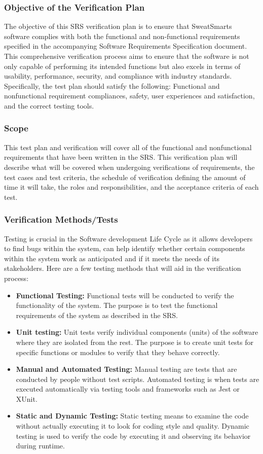 \documentclass[12pt, titlepage]{article}
\begin{document}
\subsubsection{Objective of the Verification Plan}
The objective of this SRS verification plan is to ensure that SweatSmarts software complies with both the functional and non-functional requirements specified in the accompanying Software Requirements Specification document. This comprehensive verification process aims to ensure that the software is not only capable of performing its intended functions but also excels in terms of usability, performance, security, and compliance with industry standards. Specifically, the test plan should satisfy the following: Functional and nonfunctional requirement compliances, safety, user experiences and satisfaction, and the correct testing tools.

\subsubsection{Scope}
This test plan and verification will cover all of the functional and nonfunctional requirements that have been written in the SRS. This verification plan will describe what will be covered when undergoing verifications of requirements, the test cases and test criteria, the schedule of verification defining the amount of time it will take, the roles and responsibilities, and the acceptance criteria of each test.

\subsubsection{Verification Methods/Tests}
Testing is crucial in the Software development Life Cycle as it allows developers to find bugs within the system, can help identify whether certain components within the system work as anticipated and if it meets the needs of its stakeholders. Here are a few testing methods that will aid in the verification process:

\begin{itemize}
  \item \textbf{Functional Testing:} Functional tests will be conducted to verify the functionality of the system. The purpose is to test the functional requirements of the system as described in the SRS.
  \item \textbf{Unit testing:} Unit tests verify individual components (units) of the software where they are isolated from the rest. The purpose is to create unit tests for specific functions or modules to verify that they behave correctly.
  \item \textbf{Manual and Automated Testing:} Manual testing are tests that are conducted by people without test scripts. Automated testing is when tests are executed automatically via testing tools and frameworks such as Jest or XUnit.
  \item \textbf{Static and Dynamic Testing:} Static testing means to examine the code without actually executing it to look for coding style and quality. Dynamic testing is used to verify the code by executing it and observing its behavior during runtime.
\end{itemize}
\end{document}
